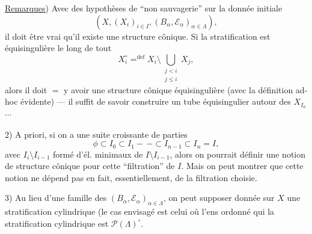 
\quad \uline{Remarques}) Avec des hypothèses de ``non sauvagerie'' sur la donnée initiale
\[
 (X,(X_i)_{i\in I},(B_\alpha,\mathcal E_\alpha)_{\alpha\in\Lambda}),
\]
il doit être vrai qu'il existe une structure cônique. Si la stratification
 est équisingulière le long de tout
\[
 X_i^\circ\mathrel{\mathop=^{\mathrm{def}}}
 X_i\setminus\bigcup_{\substack{j<i\\j\le i}}X_j,
\]
alors il doit \(=\) y avoir une structure cônique équisingulière
(avec la définition ad-hoc évidente) --- il suffit de savoir construire
un tube équisingulier autour des \(X_{I_0}\) \(\cdots\)

2) A priori, si on a une suite  croissante
de parties
\[
 \phi\subset I_0\subset I_1-\, -\subset I_{n-1}\subset I_n=I,
\]
avec 
 \(I_i\setminus I_{i-1}\) formé d'él. minimaux
de \(I\setminus I_{i-1}\), alors on pourrait définir
 une notion de structure cônique
pour cette ``filtration'' de \(I\). Mais on
peut montrer que cette notion ne dépend pas
en fait, essentiellement, de la filtration
choisie.

3) Au lieu d'une famille des \((B_\alpha,\mathcal E_\alpha)_{\alpha\in\Lambda}\),
on peut supposer donnée sur \(X\) une
stratification cylindrique  (le cas envisagé
est celui où l'ens ordonné qui 
 la stratification cylindrique est
\(\mathcal P(\Lambda)^\circ\).

